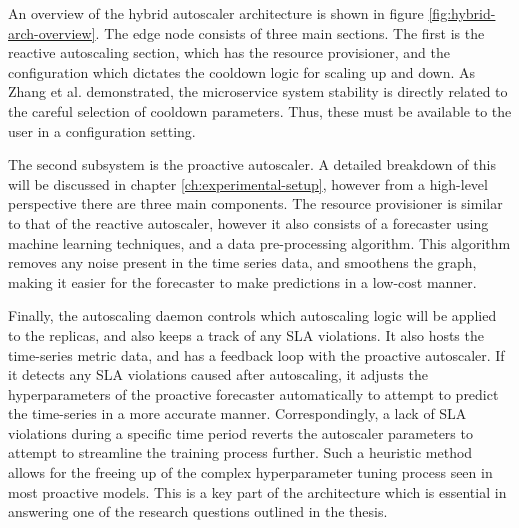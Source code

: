 An overview of the hybrid autoscaler architecture is shown in figure \ref{fig:hybrid-arch-overview}. The edge node consists of three main sections. The first is the reactive autoscaling section, which has the resource provisioner, and the configuration which dictates the cooldown logic for scaling up and down. As Zhang et al. \cite{zhang2019quantifying} demonstrated, the microservice system stability is directly related to the careful selection of cooldown parameters. Thus, these must be available to the user in a configuration setting.\par

The second subsystem is the proactive autoscaler. A detailed breakdown of this will be discussed in chapter \ref{ch:experimental-setup}, however from a high-level perspective there are three main components. The resource provisioner is similar to that of the reactive autoscaler, however it also consists of a forecaster using machine learning techniques, and a data pre-processing algorithm. This algorithm removes any noise present in the time series data, and smoothens the graph, making it easier for the forecaster to make predictions in a low-cost manner.\par

Finally, the autoscaling daemon controls which autoscaling logic will be applied to the replicas, and also keeps a track of any SLA violations. It also hosts the time-series metric data, and has a feedback loop with the proactive autoscaler. If it detects any SLA violations caused after autoscaling, it adjusts the hyperparameters of the proactive forecaster automatically to attempt to predict the time-series in a more accurate manner. Correspondingly, a lack of SLA violations during a specific time period reverts the autoscaler parameters to attempt to streamline the training process further. Such a heuristic method allows for the freeing up of the complex hyperparameter tuning process seen in most proactive models. This is a key part of the architecture which is essential in answering one of the research questions outlined in the thesis.\par
